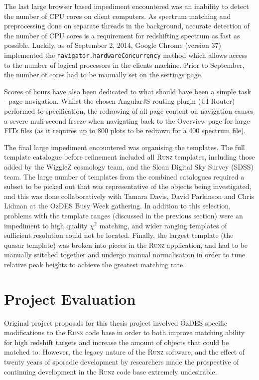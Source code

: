 \documentclass[titlesmallcaps, examinerscopy, copyrightpage]{uqthesis}
\newcommand{\runz}{\textsc{Runz}}
\begin{document}
The last large browser based impediment encountered was an inability to detect the number of CPU cores on client computers. As spectrum matching and preprocessing done on separate threads in the background, accurate detection of the number of CPU cores is a requirement for redshifting spectrum as fast as possible. Luckily, as of September 2, 2014, Google Chrome (version 37) implemented the \verb+navigator.hardwareConcurrency+ method \cite{chrome1,chrome2} which allows access to the number of logical processors in the clients machine. Prior to September, the number of cores had to be manually set on the settings page.

Scores of hours have also been dedicated to what should have been a simple task - page navigation. Whilst the chosen AngularJS routing plugin (UI Router) performed to specification, the redrawing of all page content on navigation causes a severe muli-second freeze when navigating back to the Overview page for large FITs files (as it requires up to 800 plots to be redrawn for a 400 spectrum file).

The final large impediment encountered was organising the templates. The full template catalogue before refinement included all \runz{} templates, including those added by the WiggleZ cosmology team, and the Sloan Digital Sky Survey (SDSS) team. The large number of templates from the combined catalogues required a subset to be picked out that was representative of the objects being investigated, and this was done collaboratively with Tamara Davis, David Parkinson and Chris Lidman at the OzDES Busy Week gathering. In addition to this selection, problems with the template ranges (discussed in the previous section) were an impediment to high quality $\chi^2$ matching, and wider ranging templates of sufficient resolution could not be located. Finally, the largest template (the quasar template) was broken into pieces in the \runz{} application, and had to be manually stitched together and undergo manual normalisation in order to tune relative peak heights to achieve the greatest matching rate.





\chapter{Project Evaluation}

Original project proposals for this thesis project involved OzDES specific modifications to the \runz{} code base in order to both improve matching ability for high redshift targets and increase the amount of objects that could be matched to. However, the legacy nature of the \runz{} software, and the effect of twenty years of sporadic development by researchers made the prospective of continuing development in the \runz{} code base extremely undesirable.
\end{document}

